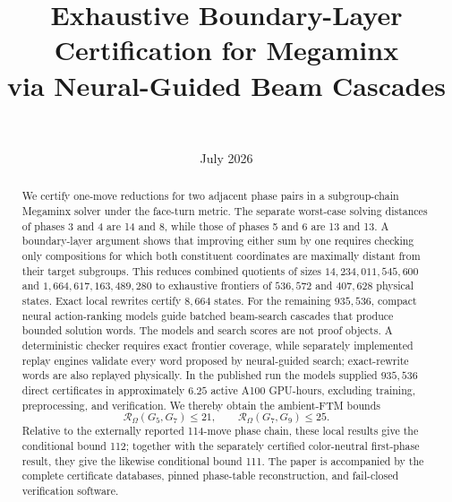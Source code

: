 \documentclass[11pt]{article}
\title{Exhaustive Boundary-Layer Certification for Megaminx\\
  via Neural-Guided Beam Cascades}
\author{\PaperAuthor\\\small \PaperAffiliation}
\date{July 2026}
\theoremstyle{definition}
\newcommand{\Rsolve}{\mathcal{R}}
\newcommand{\Gpair}[2]{\Rsolve_{\Omega}(G_{#1},G_{#2})}
\begin{document}
\maketitle

\begin{abstract}
We certify one-move reductions for two adjacent phase pairs in a subgroup-chain
Megaminx solver under the face-turn metric.  The separate worst-case solving
distances of phases 3 and 4 are 14 and 8, while those of phases 5 and 6 are 13
and 13.  A boundary-layer argument shows that improving either sum by one
requires checking only compositions for which both constituent coordinates
are maximally distant from their target subgroups.  This reduces combined
quotients of sizes $14{,}234{,}011{,}545{,}600$ and
$1{,}664{,}617{,}163{,}489{,}280$ to exhaustive frontiers of $536{,}572$ and
$407{,}628$ physical states.  Exact local rewrites certify $8{,}664$ states.
For the remaining $935{,}536$, compact neural action-ranking models guide
batched beam-search cascades that produce bounded solution words.  The models
and search scores are not proof objects.  A deterministic checker requires
exact frontier coverage, while separately implemented replay engines validate
every word proposed by neural-guided search; exact-rewrite words are also
replayed physically.  In the published run the models supplied $935{,}536$
direct certificates in approximately $6.25$ active A100 GPU-hours, excluding
training, preprocessing, and verification.  We thereby obtain the ambient-FTM
bounds
\[
  \Gpair{5}{7}\le 21,
  \qquad
  \Gpair{7}{9}\le 25.
\]
Relative to the externally reported 114-move phase chain, these local results
give the conditional bound 112; together with the separately certified
color-neutral first-phase result, they give the likewise conditional bound
111.  The paper is accompanied by the complete certificate databases, pinned
phase-table reconstruction, and fail-closed verification software.
\end{abstract}











\appendix


\begingroup
\small


\endgroup
\end{document}
